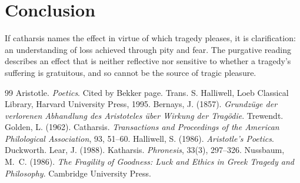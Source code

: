 \documentclass{situationist-preprint}
\begin{document}
\section{Conclusion}

If catharsis names the effect in virtue of which tragedy pleases, it is clarification: an understanding of loss achieved through pity and fear. The purgative reading describes an effect that is neither reflective nor sensitive to whether a tragedy's suffering is gratuitous, and so cannot be the source of tragic pleasure.

\begin{thebibliography}{99}\small
{} Aristotle. \emph{Poetics}. Cited by Bekker page. Trans. S. Halliwell, Loeb Classical Library, Harvard University Press, 1995.
 Bernays, J. (1857). \emph{Grundz\"uge der verlorenen Abhandlung des Aristoteles \"uber Wirkung der Trag\"odie}. Trewendt.
 Golden, L. (1962). Catharsis. \emph{Transactions and Proceedings of the American Philological Association}, 93, 51--60.
 Halliwell, S. (1986). \emph{Aristotle's Poetics}. Duckworth.
 Lear, J. (1988). Katharsis. \emph{Phronesis}, 33(3), 297--326.
 Nussbaum, M.~C. (1986). \emph{The Fragility of Goodness: Luck and Ethics in Greek Tragedy and Philosophy}. Cambridge University Press.
\end{thebibliography}
\end{document}
